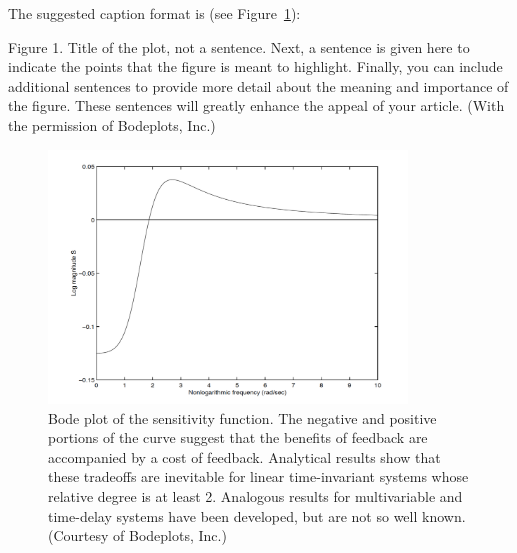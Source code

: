 \noindent The suggested caption format is (see Figure~\ref{fig1}):\\[-3em]
\bc
\begin{minipage}[t]{6in}
	Figure 1. Title of the plot, not a sentence. Next, a sentence is given here to indicate the points that the figure is meant to highlight. Finally, you can include additional sentences to provide more detail about the meaning and importance of the figure. These sentences will greatly enhance the appeal of your article. (With the permission of Bodeplots, Inc.)
\end{minipage}
\ec

\begin{figure}[t]
\centering
\includegraphics[width=0.85\textwidth,trim=10 10 10 10,clip]{figure1.pdf}
\caption{
	Bode plot of the sensitivity function. The negative and positive portions of the curve suggest that the benefits of feedback are accompanied by a cost of feedback. Analytical results show that these tradeoffs are inevitable for linear time-invariant systems whose relative degree is at least 2. Analogous results for multivariable and time-delay systems have been developed, but are not so well known. (Courtesy of Bodeplots, Inc.)}\label{fig1}
\end{figure}

